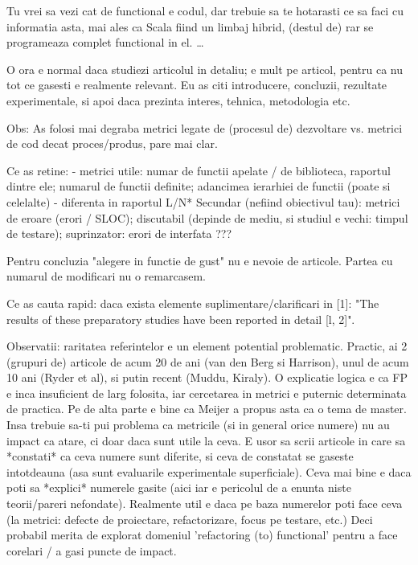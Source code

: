 \documentclass{article}
\begin{document}
Tu vrei sa vezi cat de functional e codul, dar trebuie sa te hotarasti
ce sa faci cu informatia asta, mai ales ca Scala fiind un limbaj hibrid,
(destul de) rar se programeaza complet functional in el.
…




O ora e normal daca studiezi articolul in detaliu; e mult pe articol,
pentru ca nu tot ce gasesti e realmente relevant.
Eu as citi introducere, concluzii, rezultate experimentale, si apoi
daca prezinta interes, tehnica, metodologia etc.

Obs: As folosi mai degraba metrici legate de (procesul de) dezvoltare vs.
metrici de cod decat proces/produs, pare mai clar.

Ce as retine:
- metrici utile: numar de functii apelate / de biblioteca, raportul
dintre ele; numarul de functii definite; adancimea ierarhiei de functii
(poate si celelalte)
- diferenta in raportul L/N*
Secundar (nefiind obiectivul tau): metrici de eroare (erori / SLOC);
discutabil (depinde de mediu, si studiul e vechi: timpul de testare);
suprinzator: erori de interfata ???

Pentru concluzia "alegere in functie de gust" nu e nevoie de articole.
Partea cu numarul de modificari nu o remarcasem.

Ce as cauta rapid: daca exista elemente suplimentare/clarificari in [1]:
"The results of these preparatory studies have been reported in detail
[l, 2]".

Observatii: raritatea referintelor e un element potential problematic.
Practic, ai 2 (grupuri de) articole de acum 20 de ani (van den Berg si
Harrison), unul de acum 10 ani (Ryder et al), si putin recent (Muddu,
Kiraly). O explicatie logica e ca FP e inca insuficient de larg folosita,
iar cercetarea in metrici e puternic determinata de practica.
Pe de alta parte e bine ca Meijer a propus asta ca o tema de master.
Insa trebuie sa-ti pui problema ca metricile (si in general orice numere)
nu au impact ca atare, ci doar daca sunt utile la ceva. E usor sa scrii
articole in care sa *constati* ca ceva numere sunt diferite, si ceva de
constatat se gaseste intotdeauna (asa sunt evaluarile experimentale
superficiale). Ceva mai bine e daca poti sa *explici* numerele gasite
(aici iar e pericolul de a enunta niste teorii/pareri nefondate).
Realmente util e daca pe baza numerelor poti face ceva (la metrici:
defecte de proiectare, refactorizare, focus pe testare, etc.)
Deci probabil merita de explorat domeniul 'refactoring (to) functional'
pentru a face corelari / a gasi puncte de impact.
\end{document}
